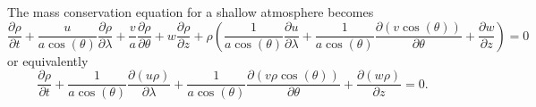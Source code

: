 \begin{prop}
The mass conservation equation for a shallow atmosphere becomes
\begin{equation}
  \frac{\partial\rho}{\partial t}
  + \frac{u}{a\cos(\theta)}\frac{\partial\rho}{\partial\lambda}
  + \frac{v}{a}\frac{\partial\rho}{\partial\theta}
  + w\frac{\partial\rho}{\partial z}
  + \rho\left(\frac{1}{a\cos(\theta)}\frac{\partial u}{\partial\lambda}
              + \frac{1}{a\cos(\theta)}\frac{\partial(v\cos(\theta))}{\partial\theta}
              + \frac{\partial w}{\partial z}
       \right)
  = 0
\end{equation}
or equivalently
\begin{equation}
  \frac{\partial\rho}{\partial t}
  + \frac{1}{a\cos(\theta)}\frac{\partial(u\rho)}{\partial\lambda}
  + \frac{1}{a\cos(\theta)}\frac{\partial(v\rho\cos(\theta))}{\partial\theta}
  + \frac{\partial(w\rho)}{\partial z}
  = 0.
\end{equation}
\end{prop}


